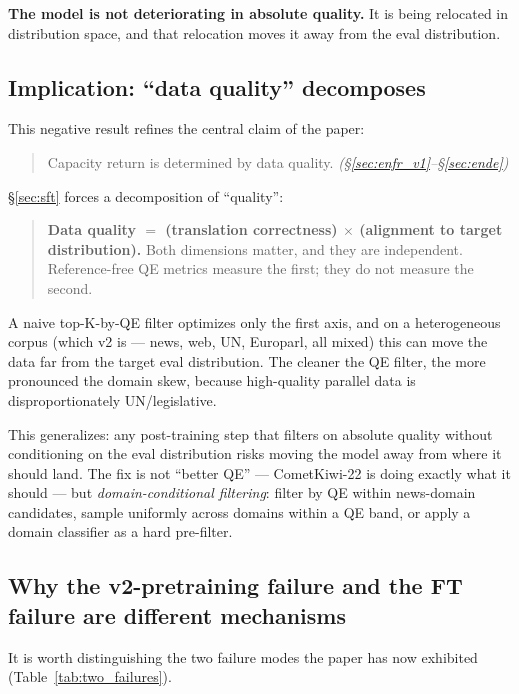 \textbf{The model is not deteriorating in absolute quality.} It is being relocated in distribution space, and that relocation moves it away from the eval distribution.

\subsection{Implication: ``data quality'' decomposes}
This negative result refines the central claim of the paper:
\begin{quote}
Capacity return is determined by data quality. \emph{(\S\ref{sec:enfr_v1}--\S\ref{sec:ende})}
\end{quote}
\S\ref{sec:sft} forces a decomposition of ``quality'':
\begin{quote}
\textbf{Data quality $=$ (translation correctness) $\times$ (alignment to target distribution).}
Both dimensions matter, and they are independent. Reference-free QE metrics measure the first; they do not measure the second.
\end{quote}

A naive top-K-by-QE filter optimizes only the first axis, and on a heterogeneous corpus (which v2 is --- news, web, UN, Europarl, all mixed) this can move the data far from the target eval distribution. The cleaner the QE filter, the more pronounced the domain skew, because high-quality parallel data is disproportionately UN/legislative.

This generalizes: any post-training step that filters on absolute quality without conditioning on the eval distribution risks moving the model away from where it should land. The fix is not ``better QE'' --- CometKiwi-22 is doing exactly what it should --- but \emph{domain-conditional filtering}: filter by QE within news-domain candidates, sample uniformly across domains within a QE band, or apply a domain classifier as a hard pre-filter.

\subsection{Why the v2-pretraining failure and the FT failure are different mechanisms}
\label{sec:why_failures_differ}

It is worth distinguishing the two failure modes the paper has now exhibited (Table~\ref{tab:two_failures}).

